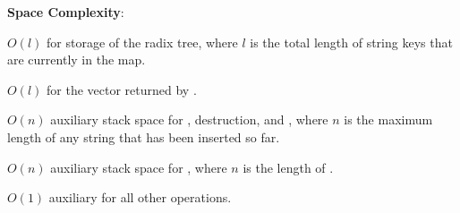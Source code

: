 \textbf{Space Complexity}:
\begin{compactitem}
  \item $O(l)$ for storage of the radix tree, where $l$ is the total length of string keys that are currently in the map.
  \item $O(l)$ for the vector returned by .
  \item $O(n)$ auxiliary stack space for , destruction, and , where $n$ is the maximum length of any string that has been inserted so far.
  \item $O(n)$ auxiliary stack space for , where $n$ is the length of .
  \item $O(1)$ auxiliary for all other operations.
\end{compactitem}

